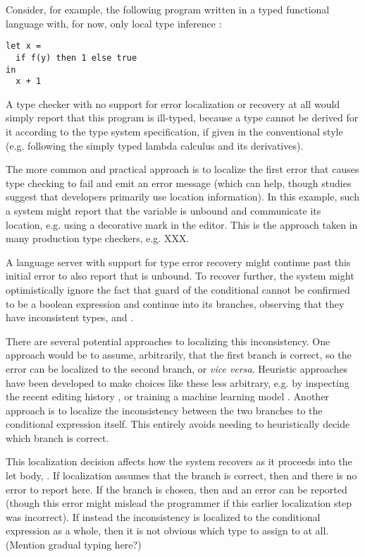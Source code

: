 Consider, for example, the following program written in a typed functional language with, for now, only local type inference \cite{pierce}: 
\begin{lstlisting}[numbers=none]
let x = 
  if f(y) then 1 else true
in 
  x + 1
\end{lstlisting}
A type checker with no support for error localization or recovery at all would simply report that this program is ill-typed, because a type cannot be derived for it according to the type system specification, if given in the conventional style (e.g. following the simply typed lambda calculus and its derivatives). 

The more common and practical approach is to localize the first error that causes type checking to fail and emit an error message (which can help, though studies suggest that developers primarily use location information). In this example, such a system might report that the variable  is unbound and communicate its location, e.g. using a decorative mark in the editor. 
This is the approach taken in many production type checkers, e.g. XXX.

A language server with support for type error recovery might continue past this initial error to also report that  is unbound. To recover further, the system might optimistically ignore the fact that guard of the conditional cannot be confirmed to be a boolean expression and continue into its branches, observing that they have inconsistent types,  and . 

There are several potential approaches to localizing this inconsistency. 
One approach would be to assume, arbitrarily, that the first branch is correct, so the error can be localized to the second branch, or \emph{vice versa}. 
Heuristic approaches have been developed to make choices like these less arbitrary, e.g. by inspecting the recent editing history , or training a machine learning model . 
Another approach is to localize the inconsistency between the two branches to the conditional expression itself. This entirely avoids needing to heuristically decide which branch is correct. 

This localization decision affects how the system recovers as it proceeds into the let body, . 
If localization assumes that the  branch is correct, then  and there is no error to report here.
If the  branch is chosen, then  and an error can be reported (though this error might mislead the programmer if this earlier localization step was incorrect). 
If instead the inconsistency is localized to the conditional expression as a whole, then it is not obvious which type to assign to  at all. (Mention gradual typing here?)

